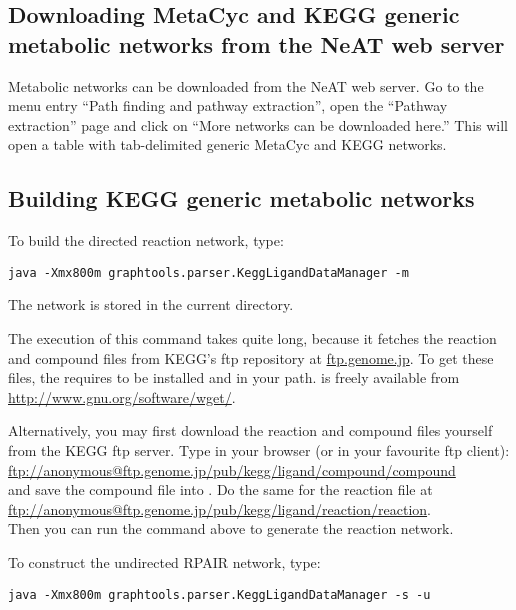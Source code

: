 \subsection{Downloading MetaCyc and KEGG generic metabolic networks from the
NeAT web server}\label{Download}

Metabolic networks can be downloaded from the NeAT web server.
Go to the menu entry ``Path finding and pathway extraction'', open the
``Pathway extraction'' page and click on ``More networks can be downloaded
here.'' This will open a table with tab-delimited generic MetaCyc and KEGG
networks.

\subsection{Building KEGG generic metabolic networks} 

To build the directed reaction network, type:

\begin{verbatim}
java -Xmx800m graphtools.parser.KeggLigandDataManager -m
\end{verbatim}

The network is stored in the current directory.

The execution of this command takes quite long, because it fetches the reaction
and compound files from KEGG's ftp repository at \url{ftp.genome.jp}. 
To get these files, the  requires
 to be installed and in your path.  is 
freely available from \url{http://www.gnu.org/software/wget/}.

Alternatively, you may first download the reaction and compound files yourself
from the KEGG ftp server. Type in your browser (or in your favourite ftp
client):\\
\url{ftp://anonymous@ftp.genome.jp/pub/kegg/ligand/compound/compound}\\
and save the compound file into . Do
the same for the reaction file at\\
\url{ftp://anonymous@ftp.genome.jp/pub/kegg/ligand/reaction/reaction}.\\ 
Then you can run the command above to generate the reaction network.

\label{RPAIR}
To construct the undirected RPAIR network, type:

\begin{verbatim}
java -Xmx800m graphtools.parser.KeggLigandDataManager -s -u
\end{verbatim}

